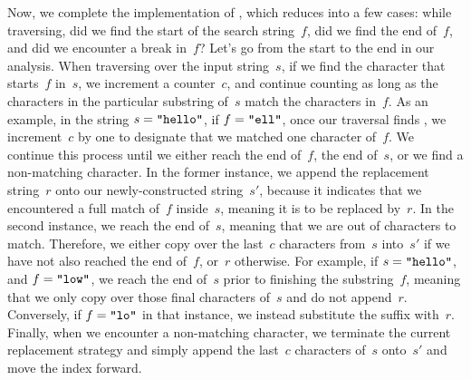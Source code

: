 Now, we complete the implementation of , which reduces into a few cases: while traversing, did we find the start of the search string~$f$, did we find the end of~$f$, and did we encounter a break in~$f$? 
Let's go from the start to the end in our analysis. 
When traversing over the input string~$s$, if we find the character that starts~$f$ in~$s$, we increment a counter~$c$, and continue counting as long as the characters in the particular substring of~$s$ match the characters in~$f$. 
As an example, in the string $s=\texttt{"hello"}$, if $f=\texttt{"ell"}$, once our traversal finds , we increment~$c$ by one to designate that we matched one character of~$f$. 
We continue this process until we either reach the end of~$f$, the end of~$s$, or we find a non-matching character. 
In the former instance, we append the replacement string~$r$ onto our newly-constructed string~$s'$, because it indicates that we encountered a full match of~$f$ inside~$s$, meaning it is to be replaced by~$r$. 
In the second instance, we reach the end of~$s$, meaning that we are out of characters to match. 
Therefore, we either copy over the last~$c$ characters from~$s$ into~$s'$ if we have not also reached the end of~$f$, or~$r$ otherwise. 
For example, if $s=\texttt{"hello"}$, and $f=\texttt{"low"}$, we reach the end of~$s$ prior to finishing the substring~$f$, meaning that we only copy over those final characters of~$s$ and do not append~$r$. 
Conversely, if $f=\texttt{"lo"}$ in that instance, we instead substitute the suffix  with~$r$. 
Finally, when we encounter a non-matching character, we terminate the current replacement strategy and simply append the last~$c$ characters of~$s$ onto~$s'$ and move the index forward.


